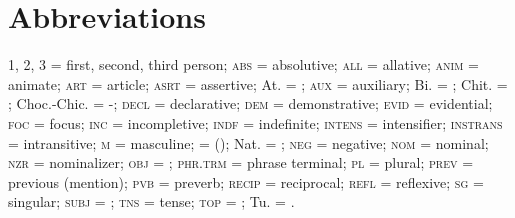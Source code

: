\documentclass[output=paper]{LSP/langsci}
\begin{document}
\section* {Abbreviations}
 \textsc{1, 2, 3} = first, second, third person; \textsc{abs} = absolutive; \textsc{all} = allative; \textsc{anim} = animate; \textsc{art} = article; \textsc{asrt} = assertive; At. = ; \textsc{aux} = auxiliary; Bi. = ; Chit. = ; Choc.-Chic. = -; \textsc{decl} = declarative; \textsc{dem} = demonstrative; \textsc{evid} = evidential; \textsc{foc} = focus; \textsc{inc} = incompletive; \textsc{indf} = indefinite;  \textsc{intens} = intensifier; \textsc{instrans} = intransitive; \textsc{m} = masculine;  =  (); Nat. = ; \textsc{neg} = negative; \textsc{nom} = nominal; \textsc{nzr} = nominalizer; \textsc{obj} = ; \textsc{phr.trm} = phrase terminal; \textsc{pl} = plural; \textsc{prev} = previous (mention); \textsc{pvb} = preverb; \textsc{recip} = reciprocal; \textsc{refl} = reflexive; \textsc{sg} = singular; \textsc{subj} = ; \textsc{tns} = tense;  \textsc{top} = ; Tu. = .

\printbibliography[heading=subbibliography,notkeyword=this]
\end{document}
